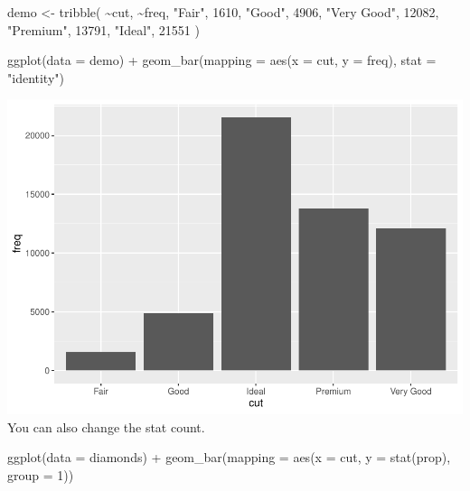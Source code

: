 \documentclass[
]{article}
\newenvironment{Shaded}{\begin{snugshade}}{\end{snugshade}}
\newcommand{\AttributeTok}[1]{\textcolor[rgb]{0.77,0.63,0.00}{#1}}
\newcommand{\DecValTok}[1]{\textcolor[rgb]{0.00,0.00,0.81}{#1}}
\newcommand{\FunctionTok}[1]{\textcolor[rgb]{0.00,0.00,0.00}{#1}}
\newcommand{\NormalTok}[1]{#1}
\newcommand{\OtherTok}[1]{\textcolor[rgb]{0.56,0.35,0.01}{#1}}
\newcommand{\SpecialCharTok}[1]{\textcolor[rgb]{0.00,0.00,0.00}{#1}}
\newcommand{\StringTok}[1]{\textcolor[rgb]{0.31,0.60,0.02}{#1}}
\begin{document}
\begin{Shaded}
\begin{Highlighting}[]
\NormalTok{demo }\OtherTok{\textless{}{-}} \FunctionTok{tribble}\NormalTok{(}
  \SpecialCharTok{\textasciitilde{}}\NormalTok{cut,         }\SpecialCharTok{\textasciitilde{}}\NormalTok{freq,}
  \StringTok{"Fair"}\NormalTok{,       }\DecValTok{1610}\NormalTok{,}
  \StringTok{"Good"}\NormalTok{,       }\DecValTok{4906}\NormalTok{,}
  \StringTok{"Very Good"}\NormalTok{,  }\DecValTok{12082}\NormalTok{,}
  \StringTok{"Premium"}\NormalTok{,    }\DecValTok{13791}\NormalTok{,}
  \StringTok{"Ideal"}\NormalTok{,      }\DecValTok{21551}
\NormalTok{)}

\FunctionTok{ggplot}\NormalTok{(}\AttributeTok{data =}\NormalTok{ demo) }\SpecialCharTok{+}
  \FunctionTok{geom\_bar}\NormalTok{(}\AttributeTok{mapping =} \FunctionTok{aes}\NormalTok{(}\AttributeTok{x =}\NormalTok{ cut, }\AttributeTok{y =}\NormalTok{ freq), }\AttributeTok{stat =} \StringTok{"identity"}\NormalTok{)}
\end{Highlighting}
\end{Shaded}

\includegraphics{Journal_files/figure-latex/unnamed-chunk-51-1.pdf} You
can also change the stat count.

\begin{Shaded}
\begin{Highlighting}[]
\FunctionTok{ggplot}\NormalTok{(}\AttributeTok{data =}\NormalTok{ diamonds) }\SpecialCharTok{+} 
  \FunctionTok{geom\_bar}\NormalTok{(}\AttributeTok{mapping =} \FunctionTok{aes}\NormalTok{(}\AttributeTok{x =}\NormalTok{ cut, }\AttributeTok{y =} \FunctionTok{stat}\NormalTok{(prop), }\AttributeTok{group =} \DecValTok{1}\NormalTok{))}
\end{Highlighting}
\end{Shaded}
\end{document}
